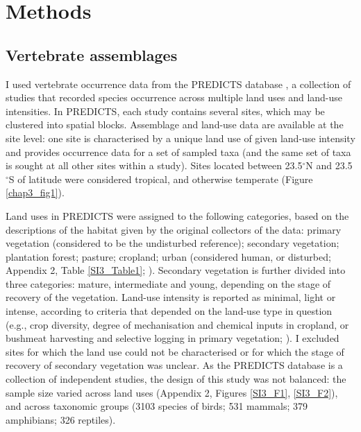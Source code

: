 \section{Methods}

\subsection{Vertebrate assemblages}

I used vertebrate occurrence data from the PREDICTS database \citep{Hudson2014, Hudson2017}, a collection of studies that recorded species occurrence across multiple land uses and land-use intensities. In PREDICTS, each study contains several sites, which may be clustered into spatial blocks. Assemblage and land-use data are available at the site level: one site is characterised by a unique land use of given land-use intensity and provides occurrence data for a set of sampled taxa (and the same set of taxa is sought at all other sites within a study). Sites located between 23.5$^{\circ}$N and 23.5$^{\circ}$S of latitude were considered tropical, and otherwise temperate (Figure \ref{chap3_fig1}).

Land uses in PREDICTS were assigned to the following categories, based on the descriptions of the habitat given by the original collectors of the data: primary vegetation (considered to be the undisturbed reference); secondary vegetation; plantation forest; pasture; cropland; urban (considered human, or disturbed; Appendix 2, Table \ref{SI3_Table1};  \cite{Hudson2014, Hudson2017}). Secondary vegetation is further divided into three categories: mature, intermediate and young, depending on the stage of recovery of the vegetation. Land-use intensity is reported as minimal, light or intense, according to criteria that depended on the land-use type in question (e.g., crop diversity, degree of mechanisation and chemical inputs in cropland, or bushmeat harvesting and selective logging in primary vegetation; \cite{Hudson2014}). I excluded sites for which the land use could not be characterised or for which the stage of recovery of secondary vegetation was unclear. As the PREDICTS database is a collection of independent studies, the design of this study was not balanced: the sample size varied across land uses (Appendix 2, Figures \ref{SI3_F1}, \ref{SI3_F2}), and across taxonomic groups (3103 species of birds; 531 mammals; 379 amphibians; 326 reptiles).

